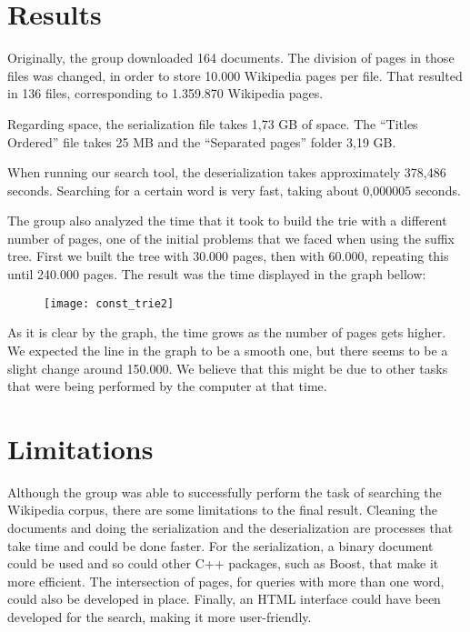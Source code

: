 \documentclass{article}
\begin{document}

\section*{Results}
Originally, the group downloaded 164 documents. The division of pages in those files was changed, in order to store 10.000 Wikipedia pages per file. That resulted in 136 files, corresponding to 1.359.870 Wikipedia pages. 

Regarding space, the serialization file takes 1,73 GB of space. The ``Titles Ordered'' file takes 25 MB and the ``Separated pages'' folder 3,19 GB. 

When running our search tool, the deserialization takes approximately 378,486 seconds. Searching for a certain word is very fast, taking about 0,000005 seconds. 

The group also analyzed the time that it took to build the trie with a different number of pages, one of the initial problems that we faced when using the suffix tree. First we built the tree with 30.000 pages, then with 60.000, repeating this until 240.000 pages. The result was the time displayed in the graph bellow:

\begin{figure}[h!]
 \centering
  \texttt{[image: const\_trie2]}
 \end{figure}

 As it is clear by the graph, the time grows as the number of pages gets higher. We expected the line in the graph to be a smooth one, but there seems to be a slight change around 150.000. We believe that this might be due to other tasks that were being performed by the computer at that time. 

\section*{Limitations}
Although the group was able to successfully perform the task of searching the Wikipedia corpus, there are some limitations to the final result. Cleaning the documents and doing the serialization and the deserialization are processes that take time and could be done faster. For the serialization, a binary document could be used and so could other C++ packages, such as Boost, that make it more efficient. The intersection of pages, for queries with more than one word, could also be developed in place. Finally, an HTML interface could have been developed for the search, making it more user-friendly.
\end{document}
